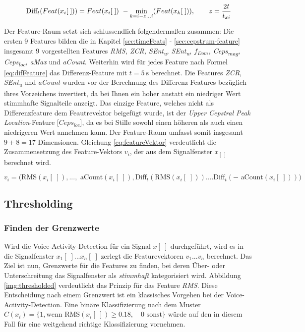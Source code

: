 \begin{equation}
\text{Diff}_t(Feat(x_i[\;])) = Feat(x_i[\;])\ - \operatorname*{min}_{k=i-z...i}( Feat(x_k[\;])), \qquad z = \frac{2 t}{t_{xi}}
\label{eq:difFeature}
\end{equation}

Der Feature-Raum setzt sich schlussendlich folgendermaßen zusammen: Die ersten 9 Features bilden die in Kapitel \ref{sec:timeFeats} - \ref{sec:cepstrum-feature} insgesamt 9 vorgestellten Features \emph{RMS, ZCR, SEnt\textsubscript{u}, SEnt\textsubscript{n}, $f_{Dom}$, Ceps\textsubscript{mag}, Ceps\textsubscript{loc}, aMax} und \emph{aCount}. Weiterhin wird für jedes Feature nach Formel \ref{eq:difFeature} das Differenz-Feature mit $t = \SI{5}{\second}$  berechnet. Die Features \emph{ZCR, SEnt\textsubscript{u}} und \emph{aCount} wurden vor der Berechnung des Differenz-Features bezüglich ihres Vorzeichens invertiert, da bei Ihnen ein hoher anstatt ein niedriger Wert stimmhafte Signalteile anzeigt. Das einzige Feature, welches nicht als Differenzfeature dem Feautrevektor beigefügt wurde, ist der \emph{Upper Cepstral Peak Location}-Feature [$Ceps_{loc}$], da es bei Stille sowohl einen höheren als auch einen niedrigeren Wert annehmen kann. Der Feature-Raum umfasst somit insgesamt $9 + 8 = 17 $ Dimensionen. Gleichung \ref{eq:featureVektor} verdeutlicht die Zusammensetzung des Feature-Vektors $v_i$, der aus dem Signalfenster $x_[\;]$ berechnet wird.

\begin{equation}
v_i = \Big( \text{RMS}(x_i[\;]), ...,\text{ aCount}(x_i[\;]), 
\text{Diff}_{t}(\text{RMS}(x_i[\;])) .... \text{Diff}_{t}(-\text{ aCount}(x_i[\;]))\Big)
\label{eq:featureVektor}
\end{equation}

\subsection{Thresholding}

\subsubsection{Finden der Grenzwerte}

Wird die Voice-Activity-Detection für ein Signal $x[\;]$ durchgeführt, wird es in die Signalfenster $x_1[\;]...x_n[\;]$ zerlegt  die Featurevektoren $v_1...v_n$ berechnet. Das Ziel ist nun, Grenzwerte für die Features zu finden, bei deren Über- oder Unterschreitung das Signalfenster als \emph{stimmhaft} kategorisiert wird. Abbildung \ref{img:thresholded} verdeutlicht das Prinzip für das Feature \emph{RMS}. Diese Entscheidung nach einem Grenzwert ist ein klassisches Vorgehen bei der Voice-Activity-Detection. Eine binäre Klassifizierung nach dem Muster $C(x_i) = \{ 1, \text{wenn } \text{RMS}(x_i[\;]) \geq 0.18 ,\quad 0 \text{ sonst}\}$ würde auf den in diesem Fall für eine weitgehend richtige Klassifizierung vornehmen.

